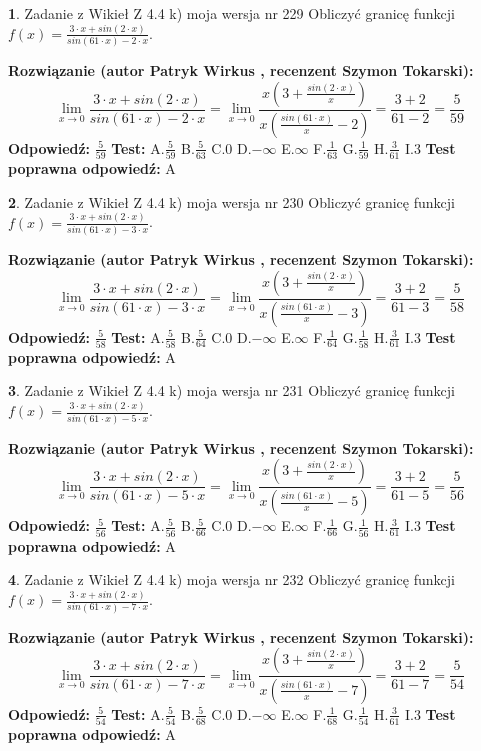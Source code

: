 \documentclass[12pt, a4paper]{article}
\theoremstyle{definition} %
\newtheorem{zad}{}
\newcommand{\zadStart}[1]{\begin{zad}#1\newline}
\newcommand{\zadStop}{\end{zad}}
\newcommand{\rozwStart}[2]{\noindent \textbf{Rozwiązanie (autor #1 , recenzent #2): }\newline}
\newcommand{\rozwStop}{\newline}
\newcommand{\odpStart}{\noindent \textbf{Odpowiedź:}\newline}
\newcommand{\odpStop}{\newline}
\newcommand{\testStart}{\noindent \textbf{Test:}\newline}
\newcommand{\testStop}{\newline}
\newcommand{\kluczStart}{\noindent \textbf{Test poprawna odpowiedź:}\newline}
\newcommand{\kluczStop}{\newline}
\begin{document}
\zadStart{Zadanie z Wikieł Z 4.4 k) moja wersja nr 229}
Obliczyć granicę funkcji $f(x)=\frac{3\cdot x +sin(2\cdot x)}{sin(61\cdot x) -2\cdot x}$.
\zadStop
\rozwStart{Patryk Wirkus}{Szymon Tokarski}
$$\lim\limits_{x\to 0}\frac{3\cdot x +sin(2\cdot x)}{sin(61\cdot x) -2\cdot x}
=\lim\limits_{x\to 0}\frac{x(3+\frac{sin(2\cdot x)}{x})}{x(\frac{sin(61\cdot x)}{x}-2)}
=\frac{3+2}{61-2} = \frac{5}{59}$$
\rozwStop
\odpStart
$\frac{5}{59}$
\odpStop
\testStart
A.$\frac{5}{59}$
B.$\frac{5}{63}$
C.$0$
D.$-\infty$
E.$\infty$
F.$\frac{1}{63}$
G.$\frac{1}{59}$
H.$\frac{3}{61}$
I.$3$
\testStop
\kluczStart
A
\kluczStop



\zadStart{Zadanie z Wikieł Z 4.4 k) moja wersja nr 230}
Obliczyć granicę funkcji $f(x)=\frac{3\cdot x +sin(2\cdot x)}{sin(61\cdot x) -3\cdot x}$.
\zadStop
\rozwStart{Patryk Wirkus}{Szymon Tokarski}
$$\lim\limits_{x\to 0}\frac{3\cdot x +sin(2\cdot x)}{sin(61\cdot x) -3\cdot x}
=\lim\limits_{x\to 0}\frac{x(3+\frac{sin(2\cdot x)}{x})}{x(\frac{sin(61\cdot x)}{x}-3)}
=\frac{3+2}{61-3} = \frac{5}{58}$$
\rozwStop
\odpStart
$\frac{5}{58}$
\odpStop
\testStart
A.$\frac{5}{58}$
B.$\frac{5}{64}$
C.$0$
D.$-\infty$
E.$\infty$
F.$\frac{1}{64}$
G.$\frac{1}{58}$
H.$\frac{3}{61}$
I.$3$
\testStop
\kluczStart
A
\kluczStop



\zadStart{Zadanie z Wikieł Z 4.4 k) moja wersja nr 231}
Obliczyć granicę funkcji $f(x)=\frac{3\cdot x +sin(2\cdot x)}{sin(61\cdot x) -5\cdot x}$.
\zadStop
\rozwStart{Patryk Wirkus}{Szymon Tokarski}
$$\lim\limits_{x\to 0}\frac{3\cdot x +sin(2\cdot x)}{sin(61\cdot x) -5\cdot x}
=\lim\limits_{x\to 0}\frac{x(3+\frac{sin(2\cdot x)}{x})}{x(\frac{sin(61\cdot x)}{x}-5)}
=\frac{3+2}{61-5} = \frac{5}{56}$$
\rozwStop
\odpStart
$\frac{5}{56}$
\odpStop
\testStart
A.$\frac{5}{56}$
B.$\frac{5}{66}$
C.$0$
D.$-\infty$
E.$\infty$
F.$\frac{1}{66}$
G.$\frac{1}{56}$
H.$\frac{3}{61}$
I.$3$
\testStop
\kluczStart
A
\kluczStop



\zadStart{Zadanie z Wikieł Z 4.4 k) moja wersja nr 232}
Obliczyć granicę funkcji $f(x)=\frac{3\cdot x +sin(2\cdot x)}{sin(61\cdot x) -7\cdot x}$.
\zadStop
\rozwStart{Patryk Wirkus}{Szymon Tokarski}
$$\lim\limits_{x\to 0}\frac{3\cdot x +sin(2\cdot x)}{sin(61\cdot x) -7\cdot x}
=\lim\limits_{x\to 0}\frac{x(3+\frac{sin(2\cdot x)}{x})}{x(\frac{sin(61\cdot x)}{x}-7)}
=\frac{3+2}{61-7} = \frac{5}{54}$$
\rozwStop
\odpStart
$\frac{5}{54}$
\odpStop
\testStart
A.$\frac{5}{54}$
B.$\frac{5}{68}$
C.$0$
D.$-\infty$
E.$\infty$
F.$\frac{1}{68}$
G.$\frac{1}{54}$
H.$\frac{3}{61}$
I.$3$
\testStop
\kluczStart
A
\kluczStop
\end{document}
